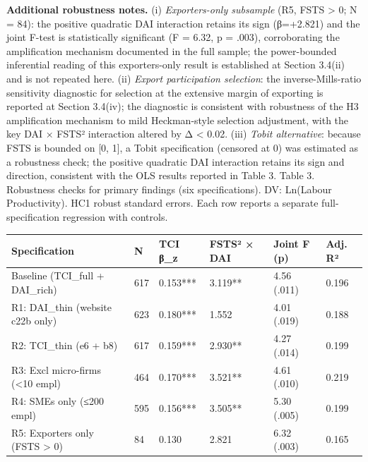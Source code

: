 \documentclass[12pt,a4paper]{article}
\begin{document}
\textbf{Additional robustness notes.} (i) \emph{Exporters-only
subsample} (R5, FSTS \textgreater{} 0; N = 84): the positive quadratic
DAI interaction retains its sign (β=+2.821) and the joint F-test is
statistically significant (F = 6.32, p = .003), corroborating the
amplification mechanism documented in the full sample; the power-bounded
inferential reading of this exporters-only result is established at
Section 3.4(ii) and is not repeated here. (ii) \emph{Export
participation selection}: the inverse-Mills-ratio sensitivity diagnostic
for selection at the extensive margin of exporting is reported at
Section 3.4(iv); the diagnostic is consistent with robustness of the H3
amplification mechanism to mild Heckman-style selection adjustment, with
the key DAI × FSTS² interaction altered by \textbar Δ\textbar{}
\textless{} 0.02. (iii) \emph{Tobit alternative}: because FSTS is
bounded on {[}0, 1{]}, a Tobit specification (censored at 0) was
estimated as a robustness check; the positive quadratic DAI interaction
retains its sign and direction, consistent with the OLS results reported
in Table 3. Table 3. Robustness checks for primary findings (six
specifications). DV: Ln(Labour Productivity). HC1 robust standard
errors. Each row reports a separate full-specification regression with
controls.

\begin{longtable}[]{@{}llllll@{}}
\toprule\noalign{}
Specification & N & TCI β\_z & FSTS² × DAI & Joint F (p) & Adj. R² \\
\midrule\noalign{}
\endhead
\bottomrule\noalign{}
\endlastfoot
Baseline (TCI\_full + DAI\_rich) & 617 & 0.153*** & 3.119** & 4.56
(.011) & 0.196 \\
R1: DAI\_thin (website c22b only) & 623 & 0.180*** & 1.552 & 4.01 (.019)
& 0.188 \\
R2: TCI\_thin (e6 + b8) & 617 & 0.159*** & 2.930** & 4.27 (.014) &
0.199 \\
R3: Excl micro-firms (\textless10 empl) & 464 & 0.170*** & 3.521** &
4.61 (.010) & 0.219 \\
R4: SMEs only (≤200 empl) & 595 & 0.156*** & 3.505** & 5.30 (.005) &
0.199 \\
R5: Exporters only (FSTS \textgreater{} 0) & 84 & 0.130 & 2.821 & 6.32
(.003) & 0.165 \\
\end{longtable}
\end{document}
